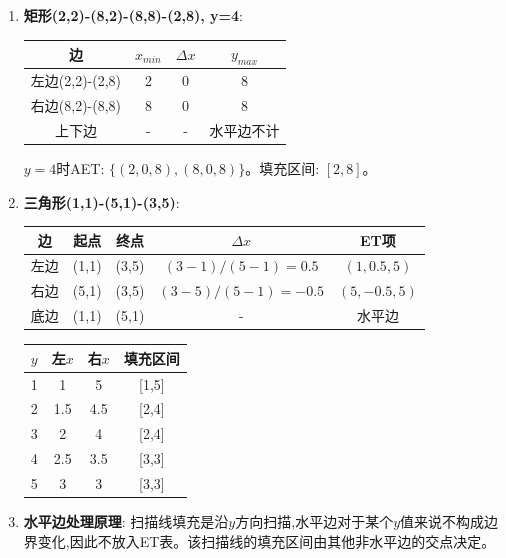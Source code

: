 \documentclass[UTF8]{ctexart}
\begin{document}
\begin{enumerate}
    \item \textbf{矩形(2,2)-(8,2)-(8,8)-(2,8), y=4}:
    \begin{center}
    \begin{tabular}{cccc}
    \toprule 边 & $x_{min}$ & $\Delta x$ & $y_{max}$ \\ \midrule
    左边(2,2)-(2,8) & 2 & 0 & 8 \\
    右边(8,2)-(8,8) & 8 & 0 & 8 \\
    上下边 & - & - & 水平边不计 \\ \bottomrule
    \end{tabular}
    \end{center}
    $y=4$时AET: $\{(2,0,8), (8,0,8)\}$。填充区间: $[2,8]$。
    
    \item \textbf{三角形(1,1)-(5,1)-(3,5)}:
    \begin{center}
    \begin{tabular}{ccccc}
    \toprule 边 & 起点 & 终点 & $\Delta x$ & ET项 \\ \midrule
    左边 & (1,1) & (3,5) & $(3-1)/(5-1)=0.5$ & $(1, 0.5, 5)$ \\
    右边 & (5,1) & (3,5) & $(3-5)/(5-1)=-0.5$ & $(5, -0.5, 5)$ \\
    底边 & (1,1) & (5,1) & - & 水平边 \\ \bottomrule
    \end{tabular}
    \end{center}
    \begin{center}
    \begin{tabular}{cccc}
    \toprule $y$ & 左$x$ & 右$x$ & 填充区间 \\ \midrule
    1 & 1 & 5 & [1,5] \\
    2 & 1.5 & 4.5 & [2,4] \\
    3 & 2 & 4 & [2,4] \\
    4 & 2.5 & 3.5 & [3,3] \\
    5 & 3 & 3 & [3,3] \\ \bottomrule
    \end{tabular}
    \end{center}
    
    \item \textbf{水平边处理原理}: 扫描线填充是沿$y$方向扫描,水平边对于某个$y$值来说不构成边界变化,因此不放入ET表。该扫描线的填充区间由其他非水平边的交点决定。
    

\end{enumerate}
\end{document}
